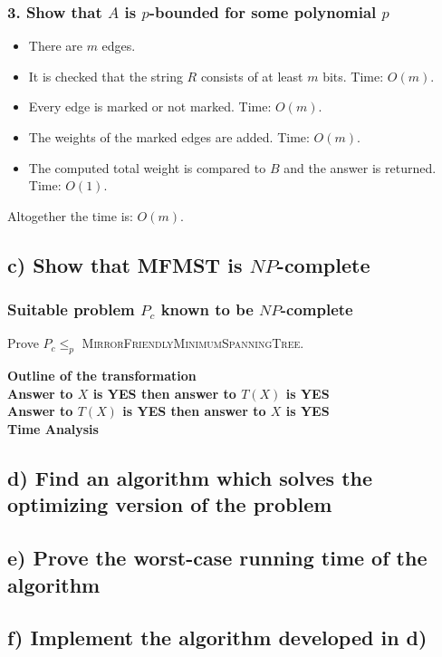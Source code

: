 \documentclass[12pt]{article}
\begin{document}
\subsubsection*{3. Show that $A$ is $p$-bounded for some polynomial $p$}
\begin{itemize}
\item[] There are $m$ edges.
\item[] It is checked that the string $R$ consists of at least $m$ bits. Time: $O(m)$.
\item[] Every edge is marked or not marked. Time: $O(m)$.
\item[] The weights of the marked edges are added. Time: $O(m)$.
\item[] The computed total weight is compared to $B$ and the answer is returned. Time: $O(1)$.
\end{itemize}
Altogether the time is: $O(m)$.
\subsection*{c) Show that MFMST is $NP$-complete}
\subsubsection*{Suitable problem $P_c$ known to be $NP$-complete}

Prove $P_c \leq_p$ \textsc{MirrorFriendlyMinimumSpanningTree}.

\textbf{Outline of the transformation}\\

\textbf{Answer to $X$ is YES then answer to $T(X)$ is YES}\\

\textbf{Answer to $T(X)$ is YES then answer to $X$ is YES}\\

\textbf{Time Analysis}

\subsection*{d) Find an algorithm which solves the optimizing version of the problem}


\subsection*{e) Prove the worst-case running time of the algorithm}


\subsection*{f) Implement the algorithm developed in d)}
\end{document}

